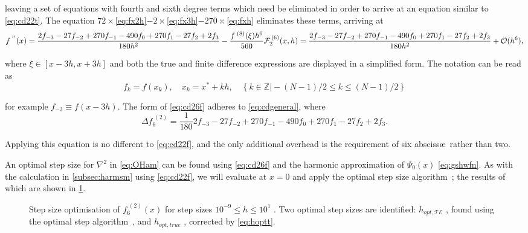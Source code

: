 leaving a set of equations with fourth and sixth degree terms which need be eliminated in order to arrive at an equation similar to \cref{eq:cd22t}.
The equation $72\times$\cref{eq:fx2h}$-2\times$\cref{eq:fx3h}$-270\times$\cref{eq:fxh} eliminates these terms, arriving at
{\mathindent=0.3cm
\begin{equation}
f^{\;''}(x) = \frac{2f_{-3}-27f_{-2}+270f_{-1}-490f_{0}+270f_{1}-27f_{2}+2f_{3}}{180h^{2}}-\frac{f^{\;(8)}(\xi)h^6}{560}\label{eq:cd26t}\\
\mathcal{F}_2^{\,(6)}(x,h) = \frac{2f_{-3}-27f_{-2}+270f_{-1}-490f_{0}+270f_{1}-27f_{2}+2f_{3}}{180h^{2}} + \mathcal{O}(h^6),\label{eq:cd26f}
\end{equation}
}

where $\xi \in [x-3h,x+3h]$ and both the true and finite difference expressions are displayed in a simplified form.
The notation can be read as
\begin{equation}
f_k = f(x_k), \quad x_k=x^*+kh, \quad \left\{k \in \mathbb{Z} \vert -(N-1)/2 \leq k \leq  (N-1)/2 \right\}
\end{equation}

for example $f_{-3} \equiv f(x-3h)$.
The form of \cref{eq:cd26f} adheres to \cref{eq:cdgeneral}, where
\begin{equation}
\Delta f_6^{\;(2)} = \frac{1}{180}2f_{-3}-27f_{-2}+270f_{-1}-490f_{0}+270f_{1}-27f_{2}+2f_{3}.\label{eq:f62x}
\end{equation}

Applying this equation is no different to \cref{eq:cd22f}, and the only additional overhead is the requirement of six absciss\ae\ rather than two.

An optimal step size for $\nabla^2$ in \cref{eq:OHam} can be found using  \cref{eq:cd26f} and the harmonic approximation of $\Psi_0(x)$ \cref{eq:gshwfn}.
As with the calculation in \cref{subsec:harmsm} using \cref{eq:cd22f}, we will evaluate at $x = 0$ and apply the optimal step size algorithm~\cite{Mathur2012}; the results of which are shown in \cref{fig:hopt7pt}.
\begin{figure}[htp]
\centering
\resizebox{\columnwidth}{!}{}
\caption[Step size optimisation of $f_2^{\;(6)}(x)$]{\label{fig:hopt7pt}Step size optimisation of $f_6^{\;(2)}(x)$ for step sizes $10^{-9}\!\leq\! h\! \leq\! 10^1$ . Two optimal step sizes are identified: $h_{opt,\mathcal{TE}}$ , found using the optimal step algorithm~\cite{Mathur2012}, and $h_{opt,true}$ , corrected by \cref{eq:hoptt}.}
\end{figure}

